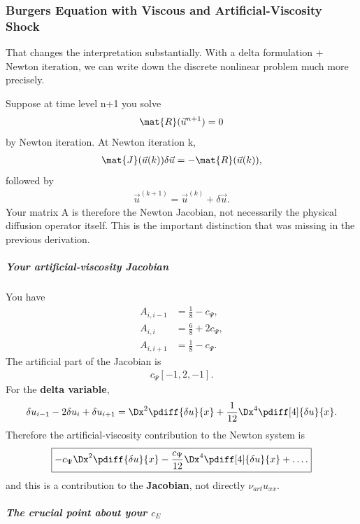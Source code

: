 \documentclass{mooiman_memo}
\begin{document}
\mooimantitle

\subsubsection*{Burgers Equation with Viscous and Artificial-Viscosity Shock}

That changes the interpretation substantially. With a delta formulation + Newton iteration, we can write down the discrete nonlinear problem much more precisely.

Suppose at time level n+1 you solve
\begin{align}
\mat{R}(\vec{u}^{n+1})=0
\end{align}
by Newton iteration.
At Newton iteration k,
\begin{align}
\mat{J}(\vec{u}(k))\delta \vec{u}=-\mat{R}(\vec{u}(k)),
\end{align}
followed by
\begin{align}
\vec{u}^{(k+1)}=\vec{u}^{(k)}+\delta \vec{u}.
\end{align}
Your matrix A is therefore the Newton Jacobian, not necessarily the physical diffusion operator itself. This is the important distinction that was missing in the previous derivation.

\subparagraph*{Your artificial-viscosity Jacobian}

You have
\begin{align}
A_{i,i - 1} & = \frac{1}{8} - c_{\Psi},
\\
A_{i,i} & = \frac{6}{8} + 2 c_{\Psi},
\\
A_{i,i+1} & = \frac{1}{8} - c_{\Psi}.
\end{align}
%
The artificial part of the Jacobian is
\begin{align}
c_{\Psi} [-1, 2, -1].
\end{align}
For the \textbf{delta variable},
\begin{align}
\delta u_{i-1} -2 \delta u_{i} + \delta u_{i+1}
=\Dx^2 \pdiff{\delta u}{x} + \frac{1}{12} \Dx^4 \pdiff[4]{\delta u}{x}.
\end{align}
Therefore the artificial-viscosity contribution to the Newton system is
\begin{align}
    \boxed{
    -c_{\Psi} \Dx^2 \pdiff{\delta u}{x} - \frac{c_{\Psi}}{12} \Dx^4 \pdiff[4]{\delta u}{x} + \ldots.
}
\end{align}
%
and this is a contribution to the \textbf{Jacobian}, not directly $\nu_{art}u_{xx}$.

\subparagraph*{The crucial point about your $c_E$}
\end{document}
